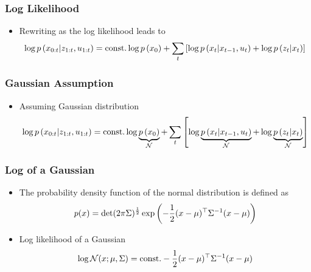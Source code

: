 \begin{frame}
    \frametitle{Log Likelihood}
    
    \begin{itemize}
        \item Rewriting as the log likelihood leads to
        \begin{equation*}
            \log p\left( x_{0:t} | z_{1:t}, u_{1:t} \right) = \text{const.}  \log p\left( x_{0} \right) + \sum_{t} \left[ \log p\left( x_{t} | x_{t-1}, u_{t} \right) + \log p\left( z_{t} | x_{t} \right) \right]
        \end{equation*}
    \end{itemize}
    
\end{frame}

\begin{frame}
    \frametitle{Gaussian Assumption}
    
    \begin{itemize}
        \item Assuming Gaussian distribution
        \begin{equation*}
            \log p\left( x_{0:t} | z_{1:t}, u_{1:t} \right) = \text{const.}  \log \underbrace{p\left( x_{0} \right)}_{\mathcal{N}} + \sum_{t} \left[ \log \underbrace{p\left( x_{t} | x_{t-1}, u_{t} \right)}_{\mathcal{N}} + \log \underbrace{p\left( z_{t} | x_{t} \right)}_{\mathcal{N}} \right]
        \end{equation*}
    \end{itemize}
    
\end{frame}

\begin{frame}
    \frametitle{Log of a Gaussian}

    
    \begin{itemize}
        \item The probability density function of the normal distribution is defined as
        \begin{equation*}
            p(x)=\det(2\pi\Sigma)^{\frac{1}{2}} \exp\left(-\dfrac{1}{2} (x - \mu )^{\top} {\Sigma}^{-1} (x - \mu )  \right)
        \end{equation*}
        
        \item Log likelihood of a Gaussian
        \begin{equation*}
            \log \mathcal{N}(x; \mu, \Sigma) =  \text{const.} - \dfrac{1}{2} (x - \mu)^{\top} {\Sigma}^{-1} (x - \mu)
        \end{equation*}
    \end{itemize}
    
\end{frame}

